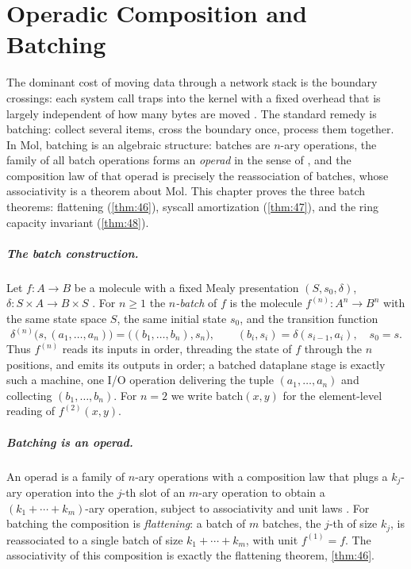 \chapter{Operadic Composition and Batching}\label{ch:operad}

The dominant cost of moving data through a network stack is the boundary crossings: each system call traps into the kernel with a fixed overhead that is largely independent of how many bytes are moved \citep{arxiv-dataplane}. The standard remedy is batching: collect several items, cross the boundary once, process them together. In Mol, batching is an algebraic structure: batches are $n$-ary operations, the family of all batch operations forms an \emph{operad} in the sense of \citet{leinster}, and the composition law of that operad is precisely the reassociation of batches, whose associativity is a theorem about Mol. This chapter proves the three batch theorems: flattening (\autoref{thm:46}), syscall amortization (\autoref{thm:47}), and the ring capacity invariant (\autoref{thm:48}).

\paragraph{The batch construction.}
Let $f : A \to B$ be a molecule with a fixed Mealy presentation $(S, s_0, \delta)$, $\delta : S \times A \to B \times S$ \citep{mealy}. For $n \geq 1$ the \emph{$n$-batch} of $f$ is the molecule $f^{(n)} : A^{n} \to B^{n}$ with the same state space $S$, the same initial state $s_0$, and the transition function
\[
\delta^{(n)}\bigl (s, (a_1, \ldots, a_n)\bigr) = \bigl ((b_1, \ldots, b_n), s_n\bigr),
\qquad (b_i, s_i) = \delta (s_{i-1}, a_i), \quad s_0 = s .
\]
Thus $f^{(n)}$ reads its inputs in order, threading the state of $f$ through the $n$ positions, and emits its outputs in order; a batched dataplane stage is exactly such a machine, one I/O operation delivering the tuple $(a_1, \ldots, a_n)$ and collecting $(b_1, \ldots, b_n)$. For $n = 2$ we write $\mathrm{batch} (x, y)$ for the element-level reading of $f^{(2)} (x, y)$.

\paragraph{Batching is an operad.}
An operad is a family of $n$-ary operations with a composition law that plugs a $k_j$-ary operation into the $j$-th slot of an $m$-ary operation to obtain a $(k_1 + \cdots + k_m)$-ary operation, subject to associativity and unit laws \citep{leinster}. For batching the composition is \emph{flattening}: a batch of $m$ batches, the $j$-th of size $k_j$, is reassociated to a single batch of size $k_1 + \cdots + k_m$, with unit $f^{(1)} = f$. The associativity of this composition is exactly the flattening theorem, \autoref{thm:46}.

